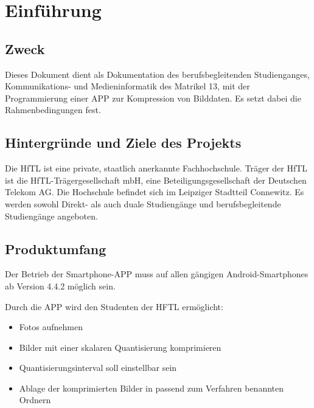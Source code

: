 
\section{Einführung}

\subsection{\textbf{Zweck}}
Dieses Dokument dient als Dokumentation des berufsbegleitenden Studienganges, Kommunikations- und Medieninformatik des Matrikel 13, mit der Programmierung einer APP zur Kompression von Bilddaten. Es setzt dabei die Rahmenbedingungen fest.

\subsection{\textbf{Hintergründe und Ziele des Projekts}}
Die \acf{HfTL} ist eine private, staatlich anerkannte Fachhochschule. Träger der \ac{HfTL} ist die \ac{HfTL}-Trägergesellschaft \acs{mbH}, eine Beteiligungsgesellschaft der Deutschen Telekom AG. Die Hochschule befindet sich im Leipziger Stadtteil Connewitz. Es werden sowohl Direkt- als auch duale Studiengänge und berufsbegleitende Studiengänge angeboten.

\subsection{\textbf{Produktumfang}}

Der Betrieb der Smartphone-APP muss auf allen gängigen Android-Smartphones ab Version 4.4.2 möglich sein.

Durch die APP wird den Studenten der HFTL ermöglicht: 

\begin{itemize}
      \item Fotos aufnehmen
      \item Bilder mit einer skalaren Quantisierung komprimieren
      \item Quantisierungsinterval soll einstellbar sein 
      \item Ablage der komprimierten Bilder in passend zum Verfahren benannten Ordnern
\end{itemize}
   



